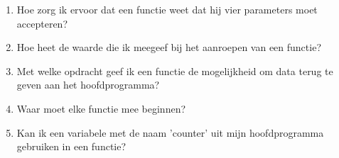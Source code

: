 \begin{enumerate}
\item Hoe zorg ik ervoor dat een functie weet dat hij vier parameters moet accepteren?
\item Hoe heet de waarde die ik meegeef bij het aanroepen van een functie?
\item Met welke opdracht geef ik een functie de mogelijkheid om data terug te geven aan het hoofdprogramma?
\item Waar moet elke functie mee beginnen?
\item Kan ik een variabele met de naam 'counter' uit mijn hoofdprogramma gebruiken in een functie?
\end{enumerate}
